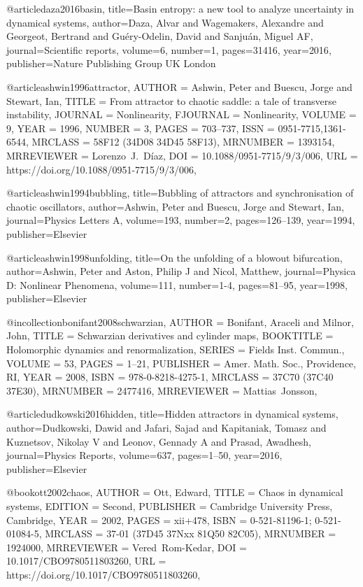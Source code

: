 @article{daza2016basin,
  title={Basin entropy: a new tool to analyze uncertainty in dynamical systems},
  author={Daza, Alvar and Wagemakers, Alexandre and Georgeot, Bertrand and Gu{\'e}ry-Odelin, David and Sanju{\'a}n, Miguel AF},
  journal={Scientific reports},
  volume={6},
  number={1},
  pages={31416},
  year={2016},
  publisher={Nature Publishing Group UK London}
}

@article{ashwin1996attractor,
    AUTHOR = {Ashwin, Peter and Buescu, Jorge and Stewart, Ian},
     TITLE = {From attractor to chaotic saddle: a tale of transverse
              instability},
   JOURNAL = {Nonlinearity},
  FJOURNAL = {Nonlinearity},
    VOLUME = {9},
      YEAR = {1996},
    NUMBER = {3},
     PAGES = {703--737},
      ISSN = {0951-7715,1361-6544},
   MRCLASS = {58F12 (34D08 34D45 58F13)},
  MRNUMBER = {1393154},
MRREVIEWER = {Lorenzo\ J.\ D\'iaz},
       DOI = {10.1088/0951-7715/9/3/006},
       URL = {https://doi.org/10.1088/0951-7715/9/3/006},
}

@article{ashwin1994bubbling,
  title={Bubbling of attractors and synchronisation of chaotic oscillators},
  author={Ashwin, Peter and Buescu, Jorge and Stewart, Ian},
  journal={Physics Letters A},
  volume={193},
  number={2},
  pages={126--139},
  year={1994},
  publisher={Elsevier}
}

@article{ashwin1998unfolding,
  title={On the unfolding of a blowout bifurcation},
  author={Ashwin, Peter and Aston, Philip J and Nicol, Matthew},
  journal={Physica D: Nonlinear Phenomena},
  volume={111},
  number={1-4},
  pages={81--95},
  year={1998},
  publisher={Elsevier}
}

@incollection{bonifant2008schwarzian,
    AUTHOR = {Bonifant, Araceli and Milnor, John},
     TITLE = {Schwarzian derivatives and cylinder maps},
 BOOKTITLE = {Holomorphic dynamics and renormalization},
    SERIES = {Fields Inst. Commun.},
    VOLUME = {53},
     PAGES = {1--21},
 PUBLISHER = {Amer. Math. Soc., Providence, RI},
      YEAR = {2008},
      ISBN = {978-0-8218-4275-1},
   MRCLASS = {37C70 (37C40 37E30)},
  MRNUMBER = {2477416},
MRREVIEWER = {Mattias\ Jonsson},
}

@article{dudkowski2016hidden,
  title={Hidden attractors in dynamical systems},
  author={Dudkowski, Dawid and Jafari, Sajad and Kapitaniak, Tomasz and Kuznetsov, Nikolay V and Leonov, Gennady A and Prasad, Awadhesh},
  journal={Physics Reports},
  volume={637},
  pages={1--50},
  year={2016},
  publisher={Elsevier}
}

@book{ott2002chaos,
 AUTHOR = {Ott, Edward},
     TITLE = {Chaos in dynamical systems},
   EDITION = {Second},
 PUBLISHER = {Cambridge University Press, Cambridge},
      YEAR = {2002},
     PAGES = {xii+478},
      ISBN = {0-521-81196-1; 0-521-01084-5},
   MRCLASS = {37-01 (37D45 37Nxx 81Q50 82C05)},
  MRNUMBER = {1924000},
MRREVIEWER = {Vered\ Rom-Kedar},
       DOI = {10.1017/CBO9780511803260},
       URL = {https://doi.org/10.1017/CBO9780511803260},
}


